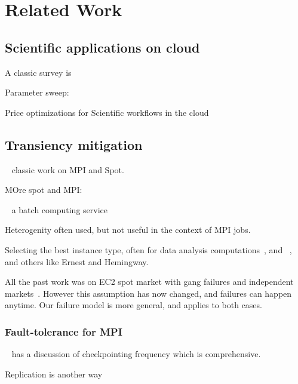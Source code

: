 \section{Related Work}

\subsection{Scientific applications on cloud}

A classic survey is ~\cite{iosup_performance_2011}
~\cite{zhai_cloud_2011}

Parameter sweep:~\cite{casanova_heuristics_2000}

Price optimizations for Scientific workflows in the cloud~\cite{gari_learning_2019}



\subsection{Transiency mitigation}

~\cite{marathe2014exploiting} classic work on MPI and Spot.

MOre spot and MPI:~\cite{gong_monetary_2015} ~\cite{xiang_spotmpi:_2011}

~\cite{spoton} a batch computing service

Heterogenity often used, but not useful in the context of MPI jobs. 
~\cite{exosphere}

Selecting the best instance type, often for data analysis computations~\cite{alipourfard_cherrypick}, and ~\cite{yadwadkar_selecting_2017}, and others like Ernest and Hemingway.


All the past work was on EC2 spot market with gang failures and independent markets~\cite{marathe2014exploiting, gong_monetary_2015}.
However this assumption has now changed, and failures can happen anytime.
Our failure model is more general, and applies to both cases.




\subsubsection{Fault-tolerance for MPI}

~\cite{dongarra_fault_nodate} has a discussion of checkpointing frequency which is comprehensive.

Replication is another way~\cite{walters_replication-based_2009}


